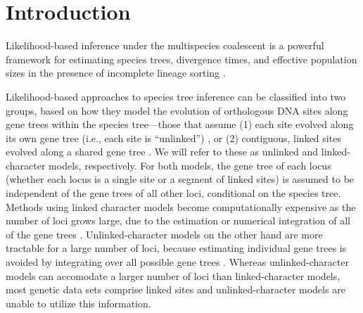 \section{Introduction}




Likelihood-based inference under the multispecies coalescent is a powerful 
framework for estimating species trees, divergence times, and effective 
population sizes in the presence of incomplete lineage sorting 
\citep{xuChallengesSpeciesTree2016}.

Likelihood-based approaches to species 
tree inference can be classified into two groups, based on how they model the 
evolution of orthologous DNA sites along gene trees within the species 
tree---those that assume (1) each site evolved along its own gene tree 
(i.e., each site is ``unlinked'') 
\citep{bryantInferringSpeciesTrees2012, maioPoMoAlleleFrequencyBased2015}, 
or (2) contiguous, linked sites evolved along a shared gene tree 
\citep{liuSpeciesTreesGene2007, Heled2010, ogilvieStarBEAST2BringsFaster2017, 
yangBPPProgramSpecies2015}. We will refer to these as unlinked and 
linked-character models, respectively. For both models, the gene tree of each 
locus (whether each locus is a single site or a segment of linked sites) 
is assumed to be independent of the gene 
trees of all other loci, conditional on the species tree.
Methods using linked character models become computationally expensive as the
number of loci grows large, due to the estimation or numerical integration of
all of the gene trees \citep{bryantInferringSpeciesTrees2012}.
Unlinked-character models on the other 
hand are more tractable for a large number of loci, because  estimating 
individual gene trees is avoided by integrating over all possible gene trees 
\citep{bryantInferringSpeciesTrees2012}.
Whereas unlinked-character models can accomodate a larger number of loci than
linked-character models, most genetic data sets comprise linked sites and
unlinked-character models are unable to utilize this information.

